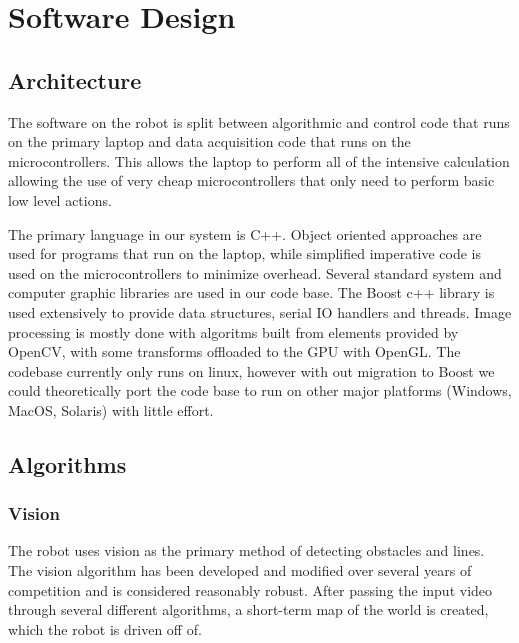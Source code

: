\section{Software Design}

\subsection{Architecture}

The software on the robot is split between algorithmic and control code that runs on the primary laptop and data acquisition code that runs on the microcontrollers. This allows the laptop to perform all of the intensive calculation allowing the use of very cheap microcontrollers that only need to perform basic low level actions.

The primary language in our system is C++. Object oriented approaches are used for programs that run on the laptop, while simplified imperative code is used on the microcontrollers to minimize overhead. Several standard system and computer graphic libraries are used in our code base. The Boost c++ library is used extensively to provide data structures, serial IO handlers and threads. Image processing is mostly done with algoritms built from elements provided by OpenCV, with some transforms offloaded to the GPU with OpenGL. The codebase currently only runs on linux, however with out migration to Boost we could theoretically port the code base to run on other major platforms (Windows, MacOS, Solaris) with little effort.

\subsection{Algorithms}

\subsubsection{Vision}

The robot uses vision as the primary method of detecting obstacles and lines. The vision algorithm has been developed and modified over several years of competition and is considered reasonably robust. After passing the input video through several different algorithms, a short-term map of the world is created, which the robot is driven off of.

